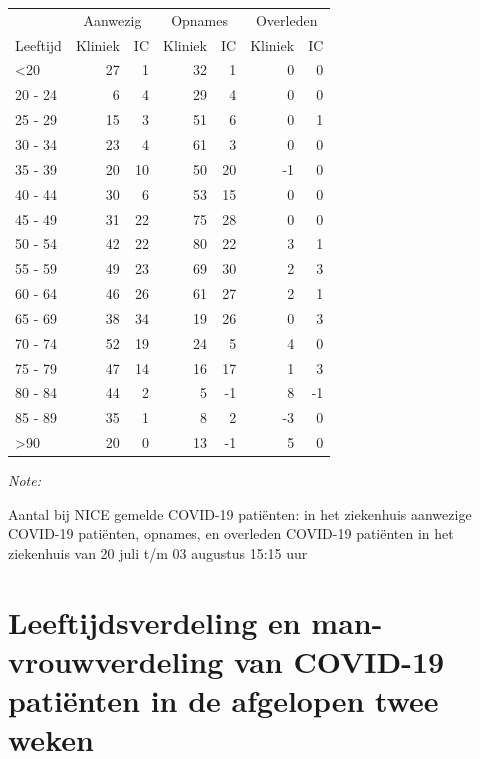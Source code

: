 \documentclass[
  english,
  man,floatsintext]{apa6}
\begin{document}
\begin{table}
\centering\begingroup\fontsize{10}{12}\selectfont

\begin{threeparttable}
\begin{tabular}{lrrrrrr}
\toprule
\multicolumn{1}{c}{ } & \multicolumn{2}{c}{Aanwezig} & \multicolumn{2}{c}{Opnames} & \multicolumn{2}{c}{Overleden} \\
\cmidrule(l{3pt}r{3pt}){2-3} \cmidrule(l{3pt}r{3pt}){4-5} \cmidrule(l{3pt}r{3pt}){6-7}
Leeftijd & Kliniek & IC & Kliniek & IC & Kliniek & IC\\
\midrule
<20 & 27 & 1 & 32 & 1 & 0 & 0\\
20 - 24 & 6 & 4 & 29 & 4 & 0 & 0\\
25 - 29 & 15 & 3 & 51 & 6 & 0 & 1\\
30 - 34 & 23 & 4 & 61 & 3 & 0 & 0\\
35 - 39 & 20 & 10 & 50 & 20 & -1 & 0\\
40 - 44 & 30 & 6 & 53 & 15 & 0 & 0\\
45 - 49 & 31 & 22 & 75 & 28 & 0 & 0\\
50 - 54 & 42 & 22 & 80 & 22 & 3 & 1\\
55 - 59 & 49 & 23 & 69 & 30 & 2 & 3\\
60 - 64 & 46 & 26 & 61 & 27 & 2 & 1\\
65 - 69 & 38 & 34 & 19 & 26 & 0 & 3\\
70 - 74 & 52 & 19 & 24 & 5 & 4 & 0\\
75 - 79 & 47 & 14 & 16 & 17 & 1 & 3\\
80 - 84 & 44 & 2 & 5 & -1 & 8 & -1\\
85 - 89 & 35 & 1 & 8 & 2 & -3 & 0\\
>90 & 20 & 0 & 13 & -1 & 5 & 0\\
\bottomrule
\end{tabular}
\begin{tablenotes}
\item \textit{Note: } 
\item Aantal bij NICE gemelde COVID-19 patiënten: in het ziekenhuis aanwezige COVID-19 patiënten, opnames, en overleden COVID-19 patiënten in het ziekenhuis van 20 juli t/m 03 augustus 15:15 uur
\end{tablenotes}
\end{threeparttable}
\endgroup{}
\end{table}

\newpage

\hypertarget{leeftijdsverdeling-en-man-vrouwverdeling-van-covid-19-patiuxebnten-in-de-afgelopen-twee-weken}{%
\section{Leeftijdsverdeling en man-vrouwverdeling van COVID-19 patiënten in de afgelopen twee weken}\label{leeftijdsverdeling-en-man-vrouwverdeling-van-covid-19-patiuxebnten-in-de-afgelopen-twee-weken}}
\end{document}
